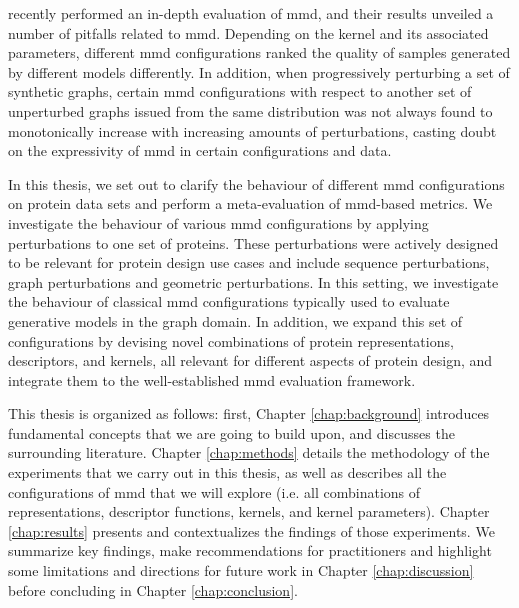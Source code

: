 \cite{obray2022evaluation} recently performed an in-depth evaluation of
\acrshort{mmd}, and their results unveiled a number of pitfalls related to
\acrshort{mmd}. Depending on the kernel and its associated parameters,
different \acrshort{mmd} configurations ranked the quality of samples generated
by different models differently. In addition, when progressively perturbing a
set of synthetic graphs, certain \acrshort{mmd} configurations with respect to
another set of unperturbed graphs issued from the same distribution was not
always found to monotonically increase with increasing amounts of perturbations,
casting doubt on the expressivity of \acrshort{mmd} in certain configurations
and data.

In this thesis, we set out to clarify the behaviour of different \acrshort{mmd}
configurations on protein data sets and perform a meta-evaluation of
\acrshort{mmd}-based metrics. We investigate the behaviour of various
\acrshort{mmd} configurations by applying perturbations to one set of proteins.
These perturbations were actively designed to be relevant for protein design use cases and include
sequence perturbations, graph perturbations and geometric perturbations. In this
setting, we investigate the behaviour of classical \acrshort{mmd} configurations
typically used to evaluate generative models in the graph domain. In addition,
we expand this set of configurations by devising novel combinations of protein
representations, descriptors, and kernels, all relevant for different aspects of
protein design, and integrate them to the well-established \acrshort{mmd}
evaluation framework.

This thesis is organized as follows: first, Chapter \ref{chap:background}
introduces fundamental concepts that we are going to build upon, and discusses
the surrounding literature. Chapter \ref{chap:methods} details the methodology
of the experiments that we carry out in this thesis, as well as
describes all the configurations of \acrshort{mmd} that we will explore (i.e. all
combinations of representations, descriptor functions, kernels, and kernel
parameters). Chapter \ref{chap:results} presents and contextualizes the findings of those
experiments. We summarize key findings, make recommendations for practitioners and
highlight some limitations and directions for future work in Chapter
\ref{chap:discussion} before concluding in Chapter \ref{chap:conclusion}.





